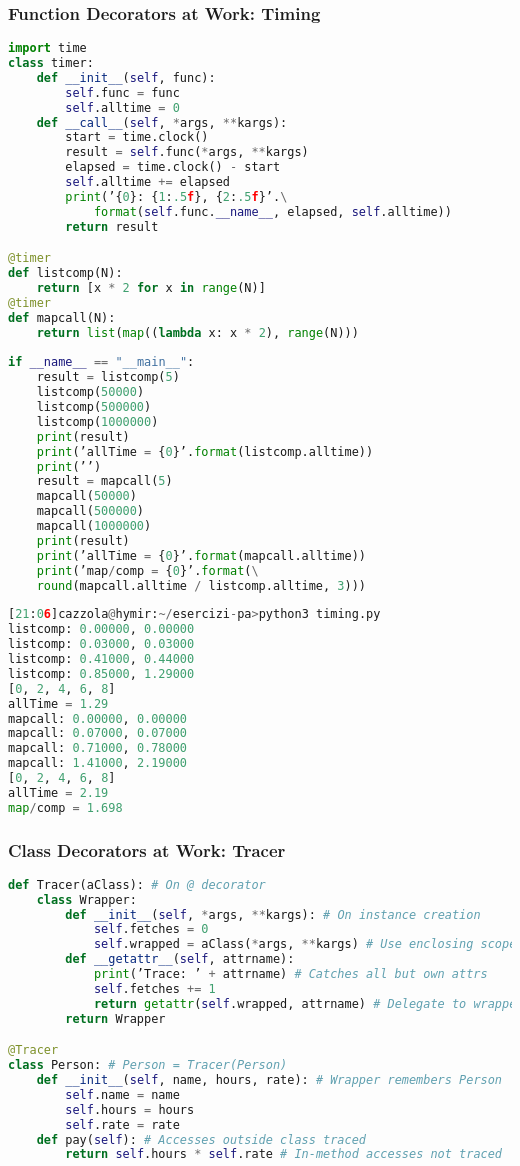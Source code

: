 \subsubsection{Function Decorators at Work: Timing}

\begin{lstlisting}[language=Python]
import time
class timer:
	def __init__(self, func):
		self.func = func
		self.alltime = 0
	def __call__(self, *args, **kargs):
		start = time.clock()
		result = self.func(*args, **kargs)
		elapsed = time.clock() - start
		self.alltime += elapsed
		print(’{0}: {1:.5f}, {2:.5f}’.\
			format(self.func.__name__, elapsed, self.alltime))
		return result

@timer
def listcomp(N):
	return [x * 2 for x in range(N)]
@timer
def mapcall(N):
	return list(map((lambda x: x * 2), range(N)))
	
if __name__ == "__main__":
	result = listcomp(5)
	listcomp(50000)
	listcomp(500000)
	listcomp(1000000)
	print(result)
	print(’allTime = {0}’.format(listcomp.alltime))
	print(’’)
	result = mapcall(5)
	mapcall(50000)
	mapcall(500000)
	mapcall(1000000)
	print(result)
	print(’allTime = {0}’.format(mapcall.alltime))
	print(’map/comp = {0}’.format(\
	round(mapcall.alltime / listcomp.alltime, 3)))
\end{lstlisting}

\begin{lstlisting}[language=Python]
[21:06]cazzola@hymir:~/esercizi-pa>python3 timing.py
listcomp: 0.00000, 0.00000
listcomp: 0.03000, 0.03000
listcomp: 0.41000, 0.44000
listcomp: 0.85000, 1.29000
[0, 2, 4, 6, 8]
allTime = 1.29
mapcall: 0.00000, 0.00000
mapcall: 0.07000, 0.07000
mapcall: 0.71000, 0.78000
mapcall: 1.41000, 2.19000
[0, 2, 4, 6, 8]
allTime = 2.19
map/comp = 1.698
\end{lstlisting}

\subsubsection{Class Decorators at Work: Tracer}

\begin{lstlisting}[language=Python]
def Tracer(aClass): # On @ decorator
	class Wrapper:
		def __init__(self, *args, **kargs): # On instance creation
			self.fetches = 0
			self.wrapped = aClass(*args, **kargs) # Use enclosing scope name
		def __getattr__(self, attrname):
			print(’Trace: ’ + attrname) # Catches all but own attrs
			self.fetches += 1
			return getattr(self.wrapped, attrname) # Delegate to wrapped obj
		return Wrapper

@Tracer
class Person: # Person = Tracer(Person)
	def __init__(self, name, hours, rate): # Wrapper remembers Person
		self.name = name
		self.hours = hours
		self.rate = rate
	def pay(self): # Accesses outside class traced
		return self.hours * self.rate # In-method accesses not traced
\end{lstlisting}

